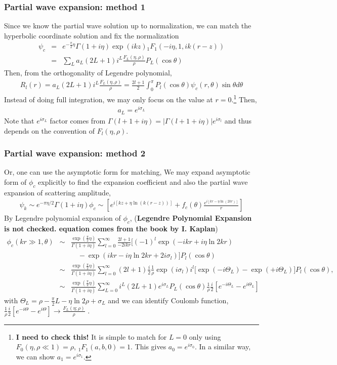 \documentclass[10pt]{book}
\newcommand{\bea}{\begin{eqnarray}}
\newcommand{\eea}{\end{eqnarray}}
\newcommand{\no}{\nonumber \\}
\begin{document}
\subsubsection{Partial wave expansion: method 1}
Since we know the partial wave solution up to normalization, 
we can match the hyperbolic coordinate solution 
and fix the normalization
\bea 
\psi_c&=& e^{-\frac{\pi}{2}\eta} \Gamma(1+i\eta)\exp(ikz)
{}_1F_1(-i\eta,1, ik(r-z))  \no 
&=& \sum_L a_L (2L+1) i^L \frac{F_L(\eta,\rho)}{\rho}P_L(\cos\theta) 
\eea 
Then, from the orthogonality of Legendre polynomial,
\bea 
R_l(r)=a_L (2L+1) i^L \frac{F_L(\eta,\rho)}{\rho}
      =\frac{2l+1}{2}\int_{0}^\pi P_l(\cos\theta) \psi_c(r,\theta) \sin\theta d\theta
\eea 
Instead of doing full integration,
 we may only focus on the value at $r=0$.\footnote{{\bf I need to check this!}
 It is simple to match for $L=0$ only using $F_0(\eta,\rho\ll 1)=\rho$, ${}_1F_1(a,b,0)=1$. 
 This gives $a_0=e^{i\sigma_0}$. In a similar way, we can show $a_1=e^{i\sigma_1}$.
 }
 Then,
 \bea 
 a_L=e^{i\sigma_L} 
 \eea 
Note that $e^{i\sigma_L}$ factor comes from $\Gamma(l+1+i\eta)=|\Gamma(l+1+i\eta)|e^{i\sigma_l}$
and thus depends on the convention of $F_l(\eta,\rho)$.

\subsubsection{Partial wave expansion: method 2}
Or, one can use the asymptotic form for matching, 
We may expand asymptotic form of $\phi_c$ explicitly to find the expansion 
coefficient and also the partial wave expansion of scattering amplitude,
\bea 
\psi_k\sim e^{-\pi\eta/2}\Gamma(1+i\eta)\phi_c \sim \left[ e^{ i[kz +\eta\ln (k(r-z))]}
        +f_c(\theta)\frac{e^{i[kr-\eta\ln(2kr)]} }{r} 
  \right]
\eea 
By Legendre polynomial expansion of $\phi_c$,
({\bf Legendre Polynomial Expansion is not checked.
equation comes from the book by I. Kaplan})
\bea
\phi_c(kr\gg 1,\theta)
&\sim &\frac{\exp(\frac{\pi}{2}\eta)}{\Gamma(1+i\eta)}
  \sum_{l=0}^\infty \frac{2l+1}{-2ikr}
  \Big[(-1)^l \exp(-ikr+i\eta\ln 2kr) \no & &\quad
  -\exp(ikr-i\eta\ln 2kr+2i\sigma_l)\Big] P_l(\cos\theta) \no 
&\sim &\frac{\exp(\frac{\pi}{2}\eta)}{\Gamma(1+i\eta)}
  \sum_{l=0}^\infty 
  (2l+1)\frac{i}{2}\frac{1}{\rho}\exp(i\sigma_l)i^l
  \Big[\exp(-i\Theta_L)-\exp(+i\Theta_L)\Big] P_l(\cos\theta)  
  ,  \no 
&\sim &\frac{\exp(\frac{\pi}{2}\eta)}{\Gamma(1+i\eta)}
   \sum_{L=0}^\infty i^L (2L+1)e^{i\sigma_L}  P_L(\cos\theta)
   \frac{1}{\rho}\frac{i}{2}[e^{-i\Theta_L}-e^{i\Theta_L}]   
\eea 
with $\Theta_L=\rho-\frac{\pi}{2}L-\eta\ln 2\rho +\sigma_L$
and we can identify Coulomb function, 
$\frac{1}{\rho}\frac{i}{2}[e^{-i\Theta}-e^{i\Theta}] 
 \to \frac{F_L(\eta;\rho)}{\rho}$ .
\end{document}
